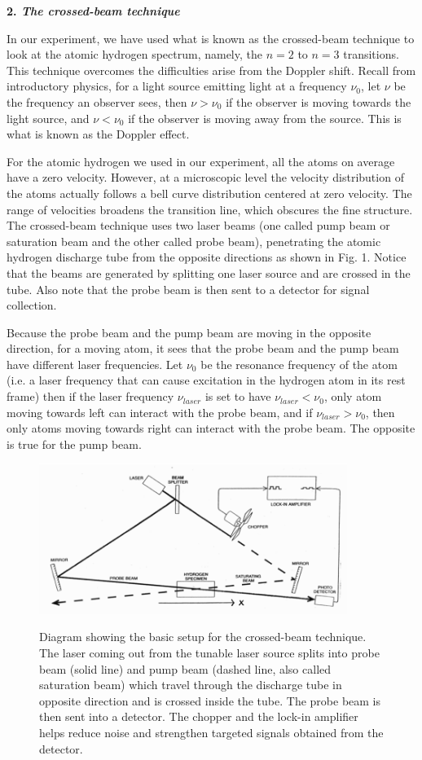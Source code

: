 \documentclass[11pt]{article}
\begin{document}
\textbf{2. \textit{The crossed-beam technique}}
\smallskip

In our experiment, we have used what is known as the crossed-beam technique to look at the atomic hydrogen spectrum, namely, the $n=2$ to $n=3$ transitions. This technique overcomes the difficulties arise from the Doppler shift. Recall from introductory physics, for a light source emitting light at a frequency $\nu_0$, let $\nu$ be the frequency an observer sees, then $\nu > \nu_0$ if the observer is moving towards the light source, and $\nu < \nu_0$ if the observer is moving away from the source. This is what is known as the Doppler effect.

For the atomic hydrogen we used in our experiment, all the atoms on average have a zero velocity. However, at a microscopic level the velocity distribution of the atoms actually follows a bell curve distribution centered at zero velocity. The range of velocities broadens the transition line, which obscures the fine structure. The crossed-beam technique uses two laser beams (one called pump beam or saturation beam and the other called probe beam), penetrating the atomic hydrogen discharge tube from the opposite directions as shown in Fig. 1. Notice that the beams are generated by splitting one laser source and are crossed in the tube. Also note that the probe beam is then sent to a detector for signal collection. 

Because the probe beam and the pump beam are moving in the opposite direction, for a moving atom, it sees that the probe beam and the pump beam have different laser frequencies. Let $\nu_0$ be the resonance frequency of the atom (i.e. a laser frequency that can cause excitation in the hydrogen atom in its rest frame) then if the laser frequency $\nu_{laser}$ is set to have $\nu_{laser} < \nu_0$, only atom moving towards left can interact with the probe beam, and if $\nu_{laser} > \nu_0$, then only atoms moving towards right can interact with the probe beam. The opposite is true for the pump beam. 

\begin{figure}[H]
\begin{center}
\includegraphics[width=10cm]{setup}
\label{Fig. 1}
\caption{Diagram showing the basic setup for the crossed-beam technique. The laser coming out from the tunable laser source splits into probe beam (solid line) and pump beam (dashed line, also called saturation beam) which travel through the discharge tube in opposite direction and is crossed inside the tube. The probe beam is then sent into a detector. The chopper and the lock-in amplifier helps reduce noise and strengthen targeted signals obtained from the detector.}
\end{center}
\end{figure}
\end{document}
